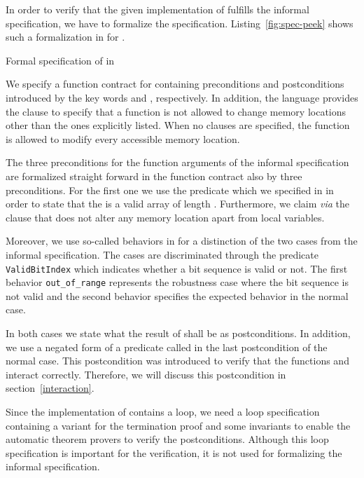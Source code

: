 In order to verify that the given implementation of \peek fulfills 
the informal specification, we have to formalize the specification.
Listing~\ref{fig:spec-peek} shows such a formalization in \acsl for \peek.

\begin{listing}[hbt]
\begin{minipage}{\textwidth}

\end{minipage}
\caption{\label{fig:spec-peek} Formal specification of \peek in \acsl}
\end{listing}

We specify a function contract for \peek containing preconditions
and postconditions introduced by the key words 
and , respectively.
In addition, the \acsl language provides the  clause to specify 
that a function is not allowed to change memory locations other than the ones 
explicitly listed. 
When no  clauses are specified, 
the function is allowed to modify every accessible memory location. 

The three preconditions for the function arguments of the informal specification 
are formalized straight forward in the function contract also by three preconditions.
For the first one we use the predicate 
which we specified in \acsl in order to state that the 
is a valid array of length .
Furthermore, we claim {\it via} the  clause 
that \peek does not alter any memory location
apart from local variables.

Moreover, we use so-called behaviors in \acsl for a distinction of the two cases
from the informal specification.
The cases are discriminated through the predicate \texttt{ValidBitIndex}
which indicates whether a bit sequence is valid or not.
The first behavior \texttt{out\_of\_range} represents the robustness 
case where the bit sequence is not valid and 
the second behavior specifies the expected behavior in the normal case.

In both cases we state what the result of \peek shall be 
as postconditions. In addition, we use a negated form of
a predicate called  in the last postcondition of
the normal case. This postcondition was introduced to verify
that the functions \peek and \poke interact correctly.
Therefore, we will discuss this postcondition in section~\ref{interaction}.

Since the implementation of \peek contains a loop,
we need a loop specification containing a variant for the termination
proof and some invariants to enable the automatic theorem provers
to verify the postconditions.
Although this loop specification is important for the verification,
it is not used for formalizing the informal specification.

